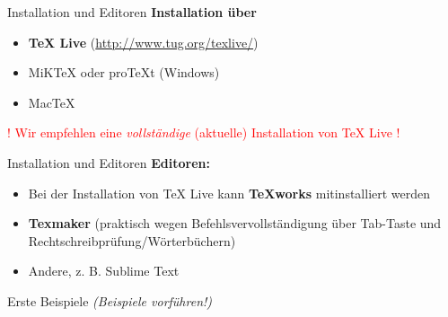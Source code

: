 \documentclass[11pt]{beamer}
\begin{document}
\begin{frame}{Installation und Editoren}
\textbf{Installation über}

\smallskip
\begin{itemize}
\item \textbf{TeX Live} (\url{http://www.tug.org/texlive/})\\
\item MiKTeX oder proTeXt (Windows)
\item MacTeX
\end{itemize}

\smallskip\noindent
\textcolor{red}{! Wir empfehlen eine \emph{vollständige} (aktuelle) Installation von TeX Live !}
\end{frame}

\begin{frame}{Installation und Editoren}
\textbf{Editoren:}

\smallskip
\begin{itemize}
\item Bei der Installation von TeX Live kann \textbf{TeXworks} mitinstalliert werden
\item \textbf{Texmaker} (praktisch wegen Befehlsvervollständigung über Tab-Taste und Rechtschreibprüfung/Wörterbüchern)
\item Andere, z. B. Sublime Text
\end{itemize}
\end{frame}

\begin{frame}{Erste Beispiele}
\emph{(Beispiele vorführen!)}
\end{frame}
\end{document}
